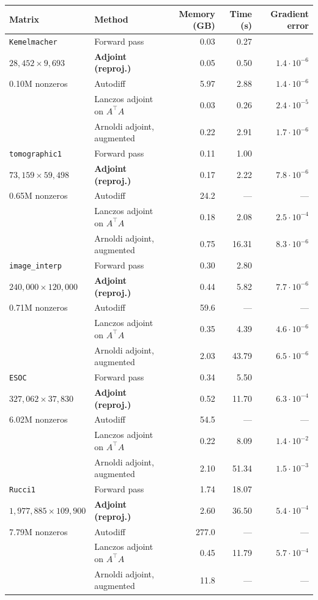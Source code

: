 \begin{tabular}{llrrr}
\toprule
Matrix & Method & Memory (GB) & Time (s) & Gradient error \\
\midrule
\texttt{Kemelmacher} & Forward pass & 0.03 & 0.27 &  \\
$28{,}452 \times 9{,}693$ & \textbf{Adjoint (reproj.)} & 0.05 & 0.50 & $1.4\cdot 10^{-6}$ \\
0.10M nonzeros & Autodiff & 5.97 & 2.88 & $1.4\cdot 10^{-6}$ \\
 & Lanczos adjoint on $A^\top A$ & 0.03 & 0.26 & $2.4\cdot 10^{-5}$ \\
 & Arnoldi adjoint, augmented & 0.22 & 2.91 & $1.7\cdot 10^{-6}$ \\
\midrule
\texttt{tomographic1} & Forward pass & 0.11 & 1.00 &  \\
$73{,}159 \times 59{,}498$ & \textbf{Adjoint (reproj.)} & 0.17 & 2.22 & $7.8\cdot 10^{-6}$ \\
0.65M nonzeros & Autodiff & 24.2 & --- & --- \\
 & Lanczos adjoint on $A^\top A$ & 0.18 & 2.08 & $2.5\cdot 10^{-4}$ \\
 & Arnoldi adjoint, augmented & 0.75 & 16.31 & $8.3\cdot 10^{-6}$ \\
\midrule
\texttt{image\_interp} & Forward pass & 0.30 & 2.80 &  \\
$240{,}000 \times 120{,}000$ & \textbf{Adjoint (reproj.)} & 0.44 & 5.82 & $7.7\cdot 10^{-6}$ \\
0.71M nonzeros & Autodiff & 59.6 & --- & --- \\
 & Lanczos adjoint on $A^\top A$ & 0.35 & 4.39 & $4.6\cdot 10^{-6}$ \\
 & Arnoldi adjoint, augmented & 2.03 & 43.79 & $6.5\cdot 10^{-6}$ \\
\midrule
\texttt{ESOC} & Forward pass & 0.34 & 5.50 &  \\
$327{,}062 \times 37{,}830$ & \textbf{Adjoint (reproj.)} & 0.52 & 11.70 & $6.3\cdot 10^{-4}$ \\
6.02M nonzeros & Autodiff & 54.5 & --- & --- \\
 & Lanczos adjoint on $A^\top A$ & 0.22 & 8.09 & $1.4\cdot 10^{-2}$ \\
 & Arnoldi adjoint, augmented & 2.10 & 51.34 & $1.5\cdot 10^{-3}$ \\
\midrule
\texttt{Rucci1} & Forward pass & 1.74 & 18.07 &  \\
$1{,}977{,}885 \times 109{,}900$ & \textbf{Adjoint (reproj.)} & 2.60 & 36.50 & $5.4\cdot 10^{-4}$ \\
7.79M nonzeros & Autodiff & 277.0 & --- & --- \\
 & Lanczos adjoint on $A^\top A$ & 0.45 & 11.79 & $5.7\cdot 10^{-4}$ \\
 & Arnoldi adjoint, augmented & 11.8 & --- & --- \\
\bottomrule
\end{tabular}
